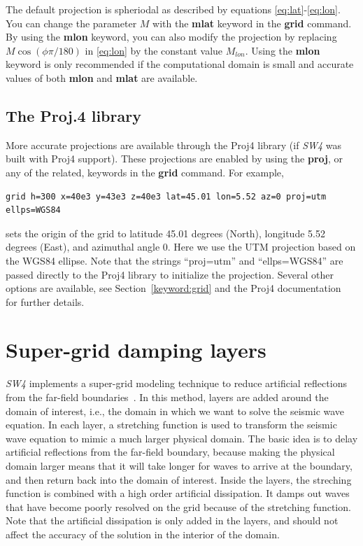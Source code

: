 \documentclass[11pt]{report}
\begin{document}
The default projection is spheriodal as described by equations \eqref{eq:lat}-\eqref{eq:lon}. You
can change the parameter $M$ with the {\bf mlat} keyword in the {\bf grid} command. By using the
	{\bf mlon} keyword, you can also modify the projection by replacing $M\cos(\phi\pi/180)$ in
\eqref{eq:lon} by the constant value $M_{lon}$. Using the {\bf mlon} keyword is only recommended if
the computational domain is small and accurate values of both {\bf mlon} and {\bf mlat} are
available.

\subsection{The Proj.4 library}
More accurate projections are available through the Proj4 library (if
\emph{SW4} was built with Proj4 support). These projections are enabled by using the {\bf proj},
or any of the related, keywords in the {\bf grid} command. For example,
\begin{verbatim}
grid h=300 x=40e3 y=43e3 z=40e3 lat=45.01 lon=5.52 az=0 proj=utm ellps=WGS84
\end{verbatim}
sets the origin of the grid to latitude 45.01 degrees (North), longitude 5.52 degrees (East), and
azimuthal angle 0. Here we use the UTM projection based on the WGS84 ellipse. Note that the strings
``proj=utm'' and ``ellps=WGS84'' are passed directly to the Proj4 library to initialize the
projection. Several other options are available, see Section~\ref{keyword:grid} and the Proj4
documentation~\cite{Proj4} for further details.

\section{Super-grid damping layers}\label{sec:supergrid}

\emph{SW4} implements a super-grid modeling technique to reduce artificial reflections from the
far-field boundaries~\cite{AppCol-09, PetSjo-14}. In this method, layers are added around the domain
of interest, i.e., the domain in which we want to solve the seismic wave equation. In each layer, a
stretching function is used to transform the seismic wave equation to mimic a much larger physical
domain. The basic idea is to delay artificial reflections from the far-field boundary, because
making the physical domain larger means that it will take longer for waves to arrive at the
boundary, and then return back into the domain of interest. Inside the layers, the streching
function is combined with a high order artificial dissipation. It damps out waves that have become
poorly resolved on the grid because of the stretching function. Note that the artificial dissipation
is only added in the layers, and should not affect the accuracy of the solution in the interior of
the domain.
\end{document}

